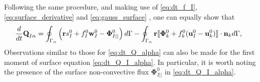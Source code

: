 Following the same procedure, and making use of \ref{eq:dt_f_I}, \ref{eq:surface_derivative} and \ref{eq:gauss_surface} , one can equally show that 
\begin{align}
    \frac{d}{dt} {\textbf{Q}_{I\alpha}}
    &= \oint_{\Gamma_{\alpha}}  \left(
        \textbf{r}s_I^0
        + f_I^0 \textbf{w}_I^0
        - \mathbf{\Phi}_{I||}^0
    \right)  d\Gamma
    - \oint_{\Gamma_{\alpha}} \textbf{r} 
    \llbracket \mathbf{\Phi}_k^0
        + f_k^0 (\textbf{u}_I^0 - \textbf{u}_k^0)
     \rrbracket \cdot \textbf{n}_k
     d\Gamma,
    \label{eq:dt_Q_I_alpha}
\end{align}
Observations similar to those for \ref{eq:dt_Q_alpha} can also be made for the first moment of surface equation \ref{eq:dt_Q_I_alpha}.
In particular, it is worth noting the presence of the surface non-convective flux $\mathbf{\Phi}_{I||}^0$ in \ref{eq:dt_Q_I_alpha}.

